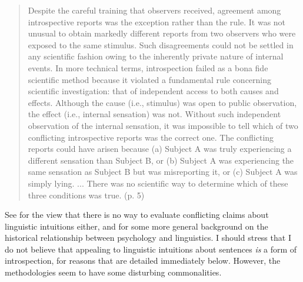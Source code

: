 \begin{quote}
Despite the careful training that observers received, agreement among introspective reports was the exception rather than the rule. It was not unusual to obtain markedly different reports from two observers who were exposed to the same stimulus. Such disagreements could not be settled in any scientific fashion owing to the inherently private nature of internal events. In more technical terms, introspection failed as a bona fide scientific method because it violated a fundamental rule concerning scientific investigation: that of independent access to both causes and effects. Although the cause (i.e., stimulus) was open to public observation, the effect (i.e., internal sensation) was not. Without such independent observation of the internal sensation, it was impossible to tell which of two conflicting introspective reports was the correct one. The conflicting reports could have arisen because (a) Subject A was truly experiencing a different sensation than Subject B, or (b) Subject A was experiencing the same sensation as Subject B but was misreporting it, or (c) Subject A was simply lying. ... There was no scientific way to determine which of these three conditions was true. (p. 5)
\end{quote}

\noindent
See \citet{Householder1965} for the view that there is no way to evaluate conflicting claims about linguistic intuitions either, and \citet{Levelt1972} for some more general background on the historical relationship between psychology and linguistics. I should stress that I do not believe that appealing to linguistic intuitions about sentences \textit{is} a form of introspection, for reasons that are detailed immediately below. However, the methodologies seem to have some disturbing commonalities.

